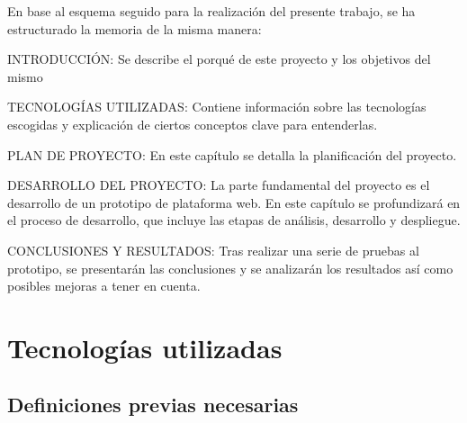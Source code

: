 \documentclass[openright,twoside,10pt]{book}
\begin{document}
    En base al esquema seguido para la realización del presente trabajo, se
    ha estructurado la memoria de la misma manera:
    
    INTRODUCCIÓN: Se describe el porqué de este proyecto y los objetivos del
    mismo
    
    TECNOLOGÍAS UTILIZADAS: Contiene información sobre las tecnologías
    escogidas y explicación de ciertos conceptos clave para entenderlas.
    
    PLAN DE PROYECTO: En este capítulo se detalla la planificación del
    proyecto.
    
    DESARROLLO DEL PROYECTO: La parte fundamental del proyecto es el
    desarrollo de un prototipo de plataforma web. En este capítulo se
    profundizará en el proceso de desarrollo, que incluye las etapas de
    análisis, desarrollo y despliegue.
    
    CONCLUSIONES Y RESULTADOS: Tras realizar una serie de pruebas al
    prototipo, se presentarán las conclusiones y se analizarán los
    resultados así como posibles mejoras a tener en cuenta.
    
    \chapter{ Tecnologías utilizadas }
    
    \section{Definiciones previas
    necesarias}\label{definiciones-previas-necesarias}
    
\end{document}
